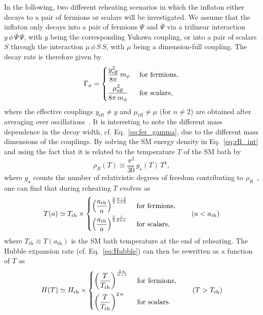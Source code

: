 \documentclass[a4paper,11pt]{article}
\newcommand{\rR}{\rho_R}
\newcommand{\Gp}{\Gamma_\phi}
\newcommand{\gs}{g_\star}
\newcommand{\arh}{a_\text{rh}}
\newcommand{\Trh}{T_\text{rh}}
\newcommand{\Hrh}{H_\text{rh}}
\begin{document}
In the following, two different reheating scenarios in which the inflaton either decays to a pair of fermions or scalars will be investigated.
We assume that the inflaton only decays into a pair of fermions $\Psi$ and $\bar\Psi$ via a trilinear interaction $y\, \phi\, \bar\Psi\, \Psi$, with $y$ being the corresponding Yukawa coupling, or into a pair of scalars $S$ through the interaction $\mu\, \phi\, S\, S$, with $\mu$ being a dimension-full coupling.
The decay rate is therefore given by
\begin{equation} \label{eq:fer_gamma}
    \Gp =
    \begin{dcases}
        \frac{y_{\text{eff}}^2}{8\pi}\, m_\phi &\text{ for fermions,}\\
        \frac{\mu_{\text{eff}}^2}{8\pi\, m_\phi} &\text{ for scalars,}
    \end{dcases}
\end{equation}
where the effective couplings $y_\text{eff} \ne y$ and $\mu_\text{eff} \ne \mu$ (for $n \neq 2$) are obtained after averaging over oscillations~\cite{Shtanov:1994ce, Garcia:2020wiy, Ichikawa:2008ne}.
It is interesting to note the different mass dependence in the decay width, cf. Eq.~\eqref{eq:fer_gamma}, due to the different mass dimensions of the couplings.
By solving the SM energy density in Eq.~\eqref{eq:rR_int} and using the fact that it is related to the temperature $T$ of the SM bath by
\begin{equation}
    \rR(T) \equiv \frac{\pi^2}{30}\, \gs(T)\, T^4,
\end{equation}
where $\gs$ counts the number of relativistic degrees of freedom contributing to $\rR$~\cite{Drees:2015exa}, one can find that during reheating $T$ evolves as
\begin{equation} \label{eq:Tfer}
    T(a) \simeq \Trh \times
    \begin{dcases}
        \left(\frac{\arh}{a}\right)^{\frac32 \frac{n - 1}{n + 2}} &\text{ for fermions},\\
        \left(\frac{\arh}{a}\right)^{\frac32 \frac{1}{2 + n}} &\text{ for scalars},
    \end{dcases}
    \qquad(a<\arh)
\end{equation}
where $\Trh \equiv T(\arh)$ is the SM bath temperature at the end of reheating.
The Hubble expansion rate (cf. Eq.~\eqref{eq:Hubble}) can then be rewritten as a function of $T$ as
\begin{equation} \label{eq:Hfer}
    H(T) \simeq \Hrh \times
    \begin{dcases}
        \left(\frac{T}{\Trh}\right)^\frac{2\, n}{n - 1} &\text{ for fermions},\\
        \left(\frac{T}{\Trh}\right)^{2\, n} &\text{ for scalars}.
    \end{dcases}
    \qquad(T>\Trh)
\end{equation}
\end{document}
